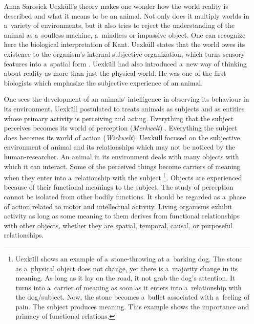 \begin{artengenv}{Anna Sarosiek}
Uexküll's theory makes one wonder how the world reality is described and what it means to be an animal. Not only does it multiply worlds in a~variety of environments, but it also tries to reject the understanding of the animal as a~soulless machine, a~mindless or impassive object. One can recognize here the biological interpretation of Kant. Uexküll states that the world owes its existence to the organism’s internal subjective organization, which turns sensory features into a~spatial form
\parencite[][p.12]{uexkull_theoretische_1920}. %
 Uexküll had also introduced a~new way of thinking about reality as more than just the physical world. He was one of the first biologists which emphasize the subjective experience of an animal.

One sees the development of an animals’ intelligence in observing its behaviour in its environment. Uexküll postulated to treats animals as subjects and as entities whose primary activity is perceiving and acting. Everything that the subject perceives becomes its world of perception (\textit{Merkwelt})
\parencite[][pp.26–28]{uexkull_streifzuge_1934}. %
 Everything the subject does becomes its world of action (\textit{Wirkwelt}). Uexküll focused on the subjective environment of animal and its relationships which may not be noticed by the human-researcher. An animal in its environment deals with many objects with which it can interact. Some of the perceived things become carriers of meaning when they enter into a~relationship with the subject 
\parencite[][pp.105–107]{uexkull_streifzuge_1934}%
\footnote{Uexküll shows an example of a~stone-throwing at a~barking dog. The stone as a~physical object does not change, yet there is a~majority change in its meaning. As long as it lay on the road, it not grab the dog's attention. It turns into a~carrier of meaning as soon as it enters into a~relationship with the dog/subject. Now, the stone becomes a~bullet associated with a~feeling of pain. The subject produces meaning. This example shows the importance and primacy of functional relations.}. Objects are experienced because of their functional meanings to the subject. The study of perception cannot be isolated from other bodily functions. It should be regarded as a~phase of action related to motor and intellectual activity. Living organisms exhibit activity as long as some meaning to them derives from functional relationships with other objects, whether they are spatial, temporal, causal, or purposeful relationships.


\end{artengenv}
